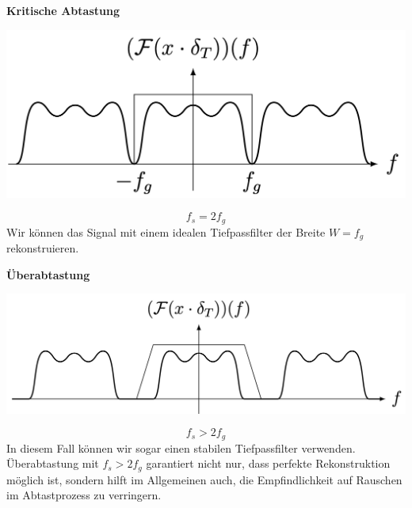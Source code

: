 \documentclass[11pt]{article}
\begin{document}
\noindent
\begin{minipage}[t]{0.32\textwidth}
    \begin{center}
        \textbf{Kritische Abtastung}
    \end{center}
    \vspace*{-0.5cm}
    \begin{center}
        \includegraphics[width=0.77\linewidth]{docimgs/krit_abtast.png}
    \end{center}
    $$f_s = 2f_g$$
    Wir können das Signal mit einem idealen Tiefpassfilter der Breite $W = f_g$ rekonstruieren.
\end{minipage}
\hfill
\begin{minipage}[t]{0.32\textwidth}
    \begin{center}
        \textbf{Überabtastung}
    \end{center}
    \vspace*{-0.5cm}
    \begin{center}
        \includegraphics[width=\linewidth]{docimgs/ueberabtast.png}
    \end{center}
    $$f_s > 2f_g$$
    In diesem Fall können wir sogar einen stabilen Tiefpassfilter verwenden. Überabtastung mit $f_s > 2f_g$ garantiert nicht nur, dass perfekte Rekonstruktion möglich ist, sondern hilft im Allgemeinen auch, die Empfindlichkeit auf Rauschen im Abtastprozess zu verringern.
\end{minipage}
\hfill
\end{document}

